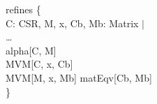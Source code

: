 \begin{myquote}
\Bpred refines \{\\
\TA \Ball C: CSR, M, x, Cb, Mb: Matrix $|$\\
\TB \ldots\\
\TB alpha[C, M] \Band\\
\TB MVM[C, x, Cb] \Band\\
\TB MVM[M, x, Mb] \Bimplies matEqv[Cb, Mb]\\
\}
\end{myquote}
